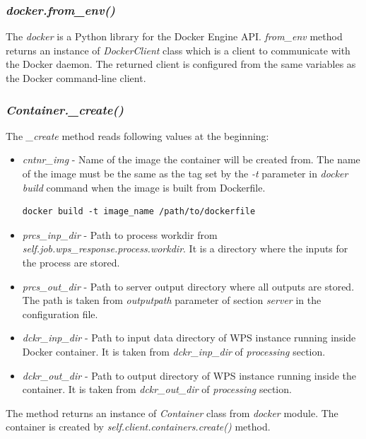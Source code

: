 \documentclass[12pt,a4paper]{article}
\begin{document}
\subsubsection{\textit{docker.from\_env()}} The \textit{docker} is a Python library for the Docker Engine API. \textit{from\_env} method
returns an instance of \textit{DockerClient} class which is a client to communicate with the Docker daemon. The returned client is
configured from the same variables as the Docker command-line client.

\subsubsection{\textit{Container.\_create()}} The \textit{\_create} method reads following values at the beginning:
\begin{itemize}
\item \textit{cntnr\_img} - Name of the image the container will be created from. The name of the image must be the same as the tag
set by the \textit{-t} parameter in \textit{docker build} command when the image is built from Dockerfile.

\bigskip
\begin{lstlisting}[basicstyle=\small,caption={Docker build command}]
docker build -t image_name /path/to/dockerfile
\end{lstlisting}

\item \textit{prcs\_inp\_dir} - Path to process workdir from \textit{self.job.wps\_response.process.workdir}. It is a directory where the
inputs for the process are stored.
\item \textit{prcs\_out\_dir} - Path to server output directory where all outputs are stored. The path is taken from \textit{outputpath}
parameter of section \textit{server} in the configuration file.
\item \textit{dckr\_inp\_dir} - Path to input data directory of WPS instance running inside Docker container. It is taken from 
\textit{dckr\_inp\_dir} of \textit{processing} section.
\item \textit{dckr\_out\_dir} - Path to output directory of WPS instance running inside the container. It is taken from 
\textit{dckr\_out\_dir} of \textit{processing} section.
\end{itemize}

The method returns an instance of \textit{Container} class from \textit{docker} module. The container is created by
\textit{self.client.containers.create()} method. 
\end{document}
